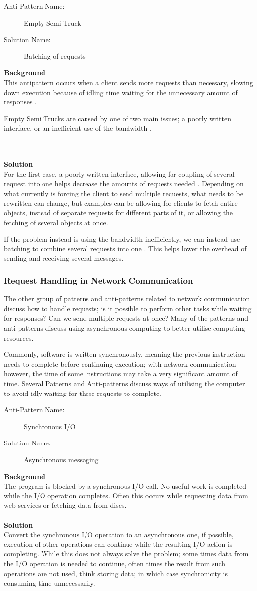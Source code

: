 \documentclass[a4paper,UKenglish]{dagrep}
\newcommand{\antipattern}[7]{
  \begin{center}
    \begin{apatt}
      \begin{description}
        \item[Anti-Pattern Name:]#1
        \ifthenelse{#2 = 0}{~}{\item[Also Known As:]#3}
        \item[Solution Name:]#5
      \end{description}
    \end{apatt}
  \end{center}
  \textbf{Background}\\#6
  ~\\\\
  \textbf{Solution}\\#7
  }
\begin{document}
\antipattern{Empty Semi Truck \cite{more_se_antipatterns,detect_antipatterns}}{0}{}{}{Batching of requests}{
	This antipattern occurs when a client sends more requests than necessary, slowing down execution because of idling time waiting for the unnecessary amount of responses \cite{detect_antipatterns}.

	Empty Semi Trucks are caused by one of two main issues; a poorly written interface, or an inefficient use of the bandwidth \cite{more_se_antipatterns}.

}{
	For the first case, a poorly written interface, allowing for coupling of several request into one helps decrease the amounts of requests needed \cite{detect_antipatterns}. Depending on what currently is forcing the client to send multiple requests, what needs to be rewritten can change, but examples can be allowing for clients to fetch entire objects, instead of separate requests for different parts of it, or allowing the fetching of several objects at once.

	If the problem instead is using the bandwidth inefficiently, we can instead use batching to combine several requests into one \cite{detect_antipatterns}. This helps lower the overhead of sending and receiving several messages.
}

\subsubsection{Request Handling in Network Communication}
The other group of patterns and anti-patterns related to network communication discuss how to handle requests; is it possible to perform other tasks while waiting for responses? Can we send multiple requests at once? Many of the patterns and anti-patterns discuss using asynchronous computing to better utilise computing resources.

Commonly, software is written synchronously, meaning the previous instruction needs to complete before continuing execution; with network communication however, the time of some instructions may take a very significant amount of time. Several Patterns and Anti-patterns discuss ways of utilising the computer to avoid idly waiting for these requests to complete.


\antipattern{Synchronous I/O \cite{MicrosoftAntipatterns}}{0}{}{}{Asynchronous messaging}{The program is blocked by a synchronous I/O call. No useful work is completed while the I/O operation completes. Often this occurs while requesting data from web services or fetching data from discs.}{ Convert the synchronous I/O operation to an asynchronous one, if possible, execution of other operations can continue while the resulting I/O action is completing. While this does not always solve the problem; some times data from the I/O operation is needed to continue, often times the result from such operations are not used, think storing data; in which case synchronicity is consuming time unnecessarily. }
\end{document}

